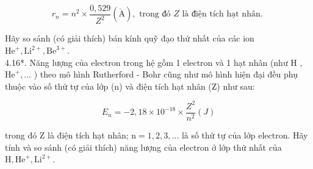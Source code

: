 \documentclass[10pt]{article}
\def\AA{\mathring{\mathrm{A}}}
\begin{document}
$$
r_{n}=n^{2} \times \frac{0,529}{Z^{2}}(\AA), \text { trong đó } Z \text { là điện tích hạt nhân. }
$$

Hãy so sánh (có giải thích) bán kính quỹ đạo thứ nhất của các ion $\mathrm{He}^{+}, \mathrm{Li}^{2+}, \mathrm{Be}^{3+}$.\\
4.16*. Năng lượng của electron trong hệ gồm 1 electron và 1 hạt nhân (như H , $\mathrm{He}^{+}, \ldots$ ) theo mô hình Rutherford - Bohr cũng như mô hình hiện đại đều phụ thuộc vào số thứ tự của lớp (n) và điện tích hạt nhân (Z) như sau:

$$
E_{n}=-2,18 \times 10^{-18} \times \frac{Z^{2}}{n^{2}}(J)
$$

trong đó Z là điện tích hạt nhân; $\mathrm{n}=1,2,3, \ldots$ là số thứ tự của lớp electron. Hãy tính và so sánh (có giải thích) năng lượng của electron ở lớp thứ nhất của $\mathrm{H}, \mathrm{He}^{+}, \mathrm{Li}^{2+}$.
\end{document}
